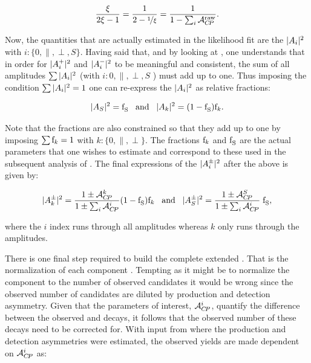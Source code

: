 \begin{equation}
  \frac{\xi}{2\xi-1} = \frac{1}{2-\nicefrac{1}{\xi}} = \frac{1}{1-\sum_i\mathcal{A}_{C\!P}^{\text{raw}}}.
\label{amp_norms_min}
\end{equation}

\noindent Now, the quantities that are actually estimated in the likelihood fit are the $|{A}_{i}|^2$ with $i:\{0,\parallel,\perp,S\}$.
Having said that, and by looking at , one understands that in order for $|{A}_{i}^+|^2$ and $|{A}_{i}^-|^2$
to be meaningful and consistent, the sum of all amplitudes $\sum|{A}_{i}|^2$ (with $i:{0,\parallel,\perp,S}$ ) must add up to one.
Thus imposing the condition $\sum|{A}_{i}|^2 = 1$ one can re-express the $|{A}_{i}|^2$ as relative fractions:

\begin{equation}
|{A}_{S}|^2 = \text{f}_{\text{S}}^{} \;\;\;\text{and}\;\;\; |{A}_{k}|^2 = (1-\text{f}_{\text{S}}^{})\text{f}_{k}.
\label{amps_param}
\end{equation}

\noindent Note that the \pwave fractions are also constrained so that they add up to one by imposing $\sum\text{f}_{k}=1$ with $k:\{0,\parallel,\perp\}$.
The fractions $\text{f}_{k}$ and $\text{f}_{\text{S}}^{}$ are the actual parameters that one wishes to estimate and correspond to these used in the subsequent analysis of
. The final expressions of the $|{A}_{i}^{\pm}|^2$ after the above is given by:

\begin{equation}
|{A}_{k}^{\pm}|^2 = \frac{1\pm\mathcal{A}_{C\!P}^{k}}{1\pm\sum_i\mathcal{A}_{C\!P}^{i}}  (1-\text{f}_{\text{S}}^{})\text{f}_{k}  \;\;\; \text{and}\;\;\; |{A}_{S}^{\pm}|^2 = \frac{1\pm\mathcal{A}_{C\!P}^{S}}{1\pm\sum_i\mathcal{A}_{C\!P}^{i}} \; \text{f}_{\text{S}}^{},
\label{amps_final}
\end{equation}

\noindent where the $i$ index runs through all amplitudes whereas $k$ only runs through the \pwave amplitudes.

There is one final step required to build the complete extended \pdf. That is the normalization of each component \pdf. Tempting as it might be to
normalize the component \pdfs to the number of observed candidates it would be wrong since the observed number of candidates are diluted by production and detection
asymmetry. Given that the parameters of interest, $\mathcal{A}_{C\!P}^{i}$, quantify the difference between the observed \BsbarJpsiKst and \BsJpsiKst decays, it follows that
the observed number of these decays need to be corrected for. With input from  where the production and detection
asymmetries were estimated, the observed yields are made dependent on $\mathcal{A}_{C\!P}^{i}$ as:

